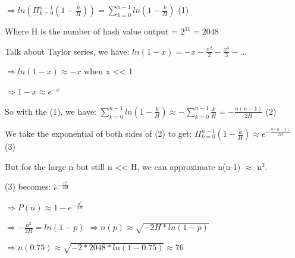 \documentclass[12pt, a4paper, oneside]{report}
\begin{document}
$\Rightarrow ln(\Pi_{k = 0}^{n-1} (1 - \frac{k}{H})) = \sum_{k = 0}^{n-1} ln(1 - \frac{k}{H})$ (1)

Where H is the number of hash value output = $2^{11} = 2048$

Talk about Taylor series, we have:
$ln (1-x) = -x - \frac{x^2}{2} - \frac{x^3}{3} - ...$

$\Rightarrow ln (1-x) \approx -x$ when x << 1

$\Rightarrow 1-x \approx e^{-x}$

So with the (1), we have:
$\sum_{k = 0}^{n-1} ln(1 - \frac{k}{H}) \approx - \sum_{k = 0}^{n-1} \frac{k}{H} = -\frac{n(n-1)}{2H}$ (2)

We take the exponential of both sides of (2) to get:
$\Pi_{k = 0}^{n-1} (1 - \frac{k}{H}) \approx e^{-\frac{n(n-1)}{2H}}$ (3)

But for the large n but still n << H, we can approximate n(n-1) $\approx$ n$^2$.

(3) becomes:
$e ^{-\frac{n^2}{2H}}$ 

$\Rightarrow P(n) \approx 1 - e^{-\frac{n^2}{2H}}$

$\Rightarrow - \frac{n^2}{2H} = ln(1 - p)$
$\Rightarrow n(p) \approx \sqrt{-2H * ln(1 - p)}$

$\Rightarrow n(0.75) \approx \sqrt{-2 * 2048 * ln(1 - 0.75)} \approx 76$
\end{document}
